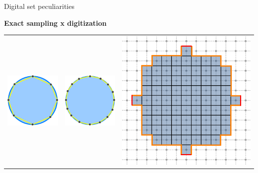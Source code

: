\begin{frame}
{Digital set peculiarities}

\textbf{Exact sampling x digitization}

\begin{center}
\begin{tabular}{ccc}
\includegraphics[scale=0.45]{figures/digital-estimators/exact-sampling/sampling-0.png}&
\includegraphics[scale=0.45]{figures/digital-estimators/exact-sampling/sampling-1.png}&
\includegraphics[scale=0.22]{figures/digital-estimators/exact-sampling/digital-ball-perimeter.png}

\end{tabular}
\end{center}
\end{frame}
